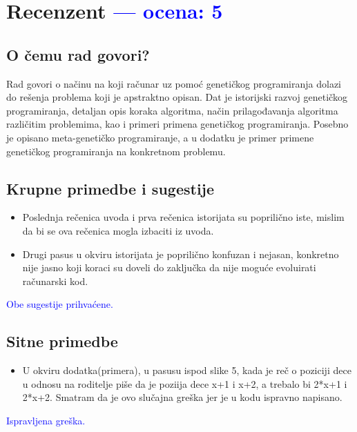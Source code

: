 \documentclass[a4paper]{report}
\newcommand{\odgovor}[1]{\textcolor{blue}{#1}}
\begin{document}
\chapter{Recenzent \odgovor{--- ocena: 5} }


\section{O čemu rad govori?}

Rad govori o načinu na koji računar uz pomoć genetičkog programiranja dolazi do rešenja problema koji je apstraktno opisan. Dat je istorijski razvoj genetičkog programiranja, detaljan opis koraka algoritma, način prilagođavanja algoritma različitim problemima, kao i primeri primena genetičkog programiranja. Posebno je opisano meta-genetičko programiranje, a u dodatku je primer primene genetičkog programiranja na konkretnom problemu.

\section{Krupne primedbe i sugestije}

\begin{itemize}
	\item Poslednja rečenica uvoda i prva rečenica istorijata su poprilično iste, mislim da bi se ova rečenica mogla izbaciti iz uvoda.
	\item Drugi pasus u okviru istorijata je poprilično konfuzan i nejasan, konkretno nije jasno koji koraci su doveli do zaključka da nije moguće evoluirati računarski kod.
\end{itemize}
\odgovor{Obe sugestije prihvaćene.}

\section{Sitne primedbe}

\begin{itemize}
	\item U okviru dodatka(primera), u pasusu ispod slike 5, kada je reč o poziciji dece u odnosu na roditelje piše da je poziija dece x+1 i x+2, a trebalo bi 2*x+1 i 2*x+2. Smatram da je ovo slučajna greška jer je u kodu ispravno napisano.
\end{itemize}
\odgovor{Ispravljena greška.}
\end{document}
